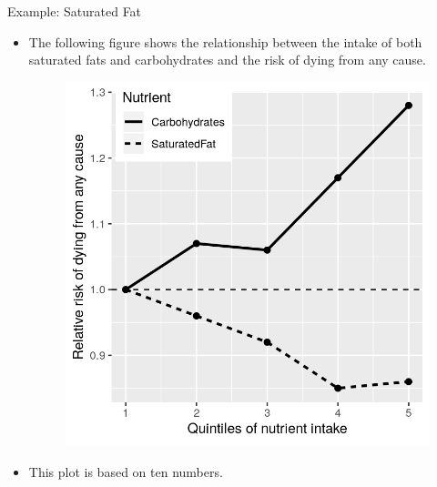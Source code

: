 \documentclass[handout]{beamer}
\begin{document}
\begin{frame}{Example: Saturated Fat}

\scriptsize{
\begin{itemize}
\item The following figure shows the relationship between the intake of both saturated fats and carbohydrates and the risk of dying from any cause.

\begin{figure}[h!]
	\centering
	\includegraphics[scale=0.55]{pics/PureDeathSatFat-1.png}
\end{figure}


\item This plot is based on ten numbers.

\end{itemize}

}
 
\end{frame}
\end{document}
